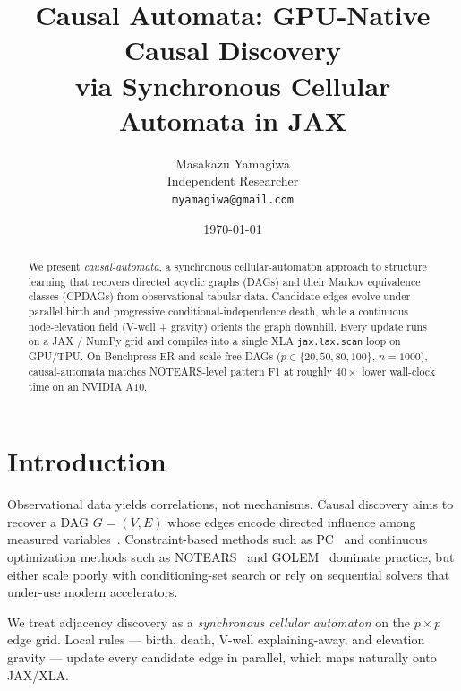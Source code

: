 \documentclass{article}
\title{Causal Automata: GPU-Native Causal Discovery\\
via Synchronous Cellular Automata in JAX}
\author{
  Masakazu Yamagiwa\\
  Independent Researcher\\
  \texttt{myamagiwa@gmail.com}
}
\date{\today}
\begin{document}
\maketitle

\begin{abstract}
We present \emph{causal-automata}, a synchronous cellular-automaton approach to
structure learning that recovers directed acyclic graphs (DAGs) and their Markov
equivalence classes (CPDAGs) from observational tabular data.
Candidate edges evolve under parallel birth and progressive
conditional-independence death, while a continuous node-elevation field
(V-well + gravity) orients the graph downhill.
Every update runs on a JAX / NumPy grid and compiles into a single XLA
\texttt{jax.lax.scan} loop on GPU/TPU.
On Benchpress ER and scale-free DAGs (\(p\in\{20,50,80,100\}\), \(n=1000\)),
causal-automata matches NOTEARS-level pattern F1 at roughly
\(40\times\) lower wall-clock time on an NVIDIA A10.
\end{abstract}


\section{Introduction}
\label{sec:intro}


Observational data yields correlations, not mechanisms.
Causal discovery aims to recover a DAG \(G=(V,E)\) whose edges encode directed
influence among measured variables~\citep{spirtes2000,pearl2009}.
Constraint-based methods such as PC~\citep{spirtes2000} and continuous
optimization methods such as NOTEARS~\citep{zheng2018} and
GOLEM~\citep{ng2020} dominate practice, but either scale poorly with
conditioning-set search or rely on sequential solvers that under-use modern
accelerators.

We treat adjacency discovery as a \emph{synchronous cellular automaton} on the
\(p\times p\) edge grid.
Local rules --- birth, death, V-well explaining-away, and elevation gravity ---
update every candidate edge in parallel, which maps naturally onto JAX/XLA.
\end{document}
